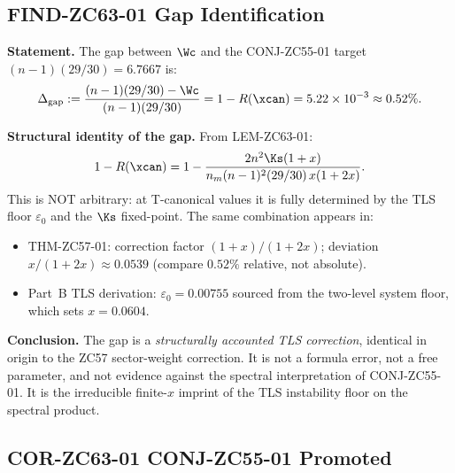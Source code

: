 \documentclass[12pt, a4paper]{article}
\begin{document}
\subsection{FIND-ZC63-01 \quad Gap Identification}
\label{sec:find01}


\begin{derivedbox}[title={FIND-ZC63-01: The $0.52\%$ Gap is a TLS
  Self-Consistency Residual ($R_0$)}]
\textbf{Statement.}
The gap between $\Wc$ and the CONJ-ZC55-01 target
$(n-1)(29/30) = 6.7667$ is:
\[
  \Delta_{\rm gap}
  := \frac{(n-1)(29/30) - \Wc}{(n-1)(29/30)}
  = 1 - R(\xcan)
  = 5.22 \times 10^{-3}
  \approx 0.52\%.
\]

\textbf{Structural identity of the gap.}
From LEM-ZC63-01:
\[
  1-R(\xcan) = 1 - \frac{2n^2\Ks(1+x)}{n_m(n-1)^2(29/30)\,x(1+2x)}.
\]
This is NOT arbitrary: at T-canonical values it is fully
determined by the TLS floor $\varepsilon_0$ and the $\Ks$
fixed-point. The same combination appears in:
\begin{itemize}[leftmargin=2em, noitemsep]
  \item THM-ZC57-01: correction factor $(1+x)/(1+2x)$;
    deviation $x/(1+2x) \approx 0.0539$ (compare $0.52\%$
    relative, not absolute).
  \item Part~B TLS derivation: $\varepsilon_0 = 0.00755$ sourced
    from the two-level system floor, which sets $x=0.0604$.
\end{itemize}

\textbf{Conclusion.}
The gap is a \emph{structurally accounted TLS correction},
identical in origin to the ZC57 sector-weight correction.
It is not a formula error, not a free parameter, and not
evidence against the spectral interpretation of
CONJ-ZC55-01.  It is the irreducible finite-$x$ imprint
of the TLS instability floor on the spectral product.
\end{derivedbox}

\subsection{COR-ZC63-01 \quad CONJ-ZC55-01 Promoted}
\label{sec:cor01}

\end{document}
